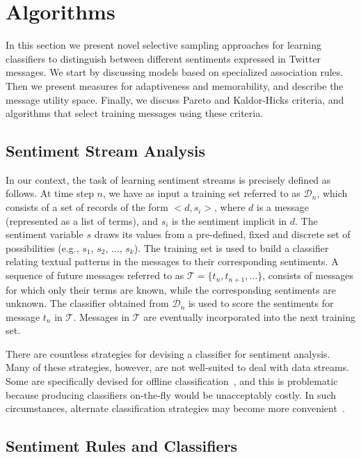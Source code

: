 \section{Algorithms}

In this section we present novel selective sampling approaches for learning classifiers to distinguish between different sentiments expressed in Twitter messages. We start by discussing models based on specialized association rules.
Then we present measures for adaptiveness and memorability, and describe the message utility space. Finally, we discuss Pareto and Kaldor-Hicks criteria, and algorithms that select training messages using these criteria.

\subsection{Sentiment Stream Analysis}

In our context, the task of learning sentiment streams is precisely defined as follows. At time step $n$, we have as input
a training set referred to as $\mathcal{D}_n$, which consists of
a set of records of the form $<d,s_i>$, where $d$ is a
message (represented as a list of terms),
and $s_i$ is the sentiment implicit in $d$.
The sentiment variable $s$ draws its values from a pre-defined, fixed and discrete set of possibilities (e.g., $s_1$,
$s_2$, $\ldots$, $s_k$).
The training set is used to build a classifier relating textual patterns in the messages to their corresponding sentiments.
A sequence of future messages referred to as $\mathcal{T}=\{t_n, t_{n+1}, \ldots\}$, consists of messages
for which only their terms are known, while the corresponding sentiments are unknown.
The classifier obtained from $\mathcal{D}_n$ is used
to score the sentiments for message $t_n$ in $\mathcal{T}$.
Messages in $\mathcal{T}$ are eventually incorporated into the next training set.

There are countless strategies for devising
a classifier for sentiment analysis. Many of these strategies, however, are not well-suited to deal with data streams. Some are specifically devised for offline classification~\cite{trees,cortes}, and this is problematic because producing classifiers on-the-fly would be unacceptably costly. %
In such circumstances, alternate classification strategies may become more convenient~\cite{calibrated}.

\subsection{Sentiment Rules and Classifiers}

